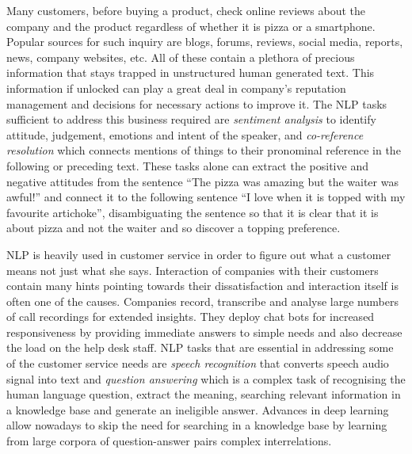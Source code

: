 Many customers, before buying a product, check online reviews about the company and the product regardless of whether it is pizza or a smartphone. Popular sources for such inquiry are blogs, forums, reviews, social media, reports, news, company websites, etc. All of these contain a plethora of precious information that stays trapped in unstructured human generated text. This information if unlocked can play a great deal in company's reputation management and decisions for necessary actions to improve it. The NLP tasks sufficient to address this business required are \textit{sentiment analysis} to identify attitude, judgement, emotions and intent of the speaker, and \textit{co-reference resolution} which connects mentions of things to their pronominal reference in the following or preceding text. These tasks alone can extract the positive and negative attitudes from the sentence ``The pizza was amazing but the waiter was awful!'' and connect it to the following sentence ``I love when it is topped with my favourite artichoke'', disambiguating the sentence so that it is clear that it is about pizza and not the waiter and so discover a topping preference.

NLP is heavily used in customer service in order to figure out what a customer means not just what she says. Interaction of companies with their customers contain many hints pointing towards their dissatisfaction and interaction itself is often one of the causes. Companies record, transcribe and analyse large numbers of call recordings for extended insights. They deploy chat bots for increased responsiveness by providing immediate answers to simple needs and also decrease the load on the help desk staff. NLP tasks that are essential in addressing some of the customer service needs are \textit{speech recognition} that converts speech audio signal into text and \textit{question answering} which is a complex task of recognising the human language question, extract the meaning, searching relevant information in a knowledge base and generate an ineligible answer. Advances in deep learning allow nowadays to skip the need for searching in a knowledge base by learning from large corpora of question-answer pairs complex interrelations. 

